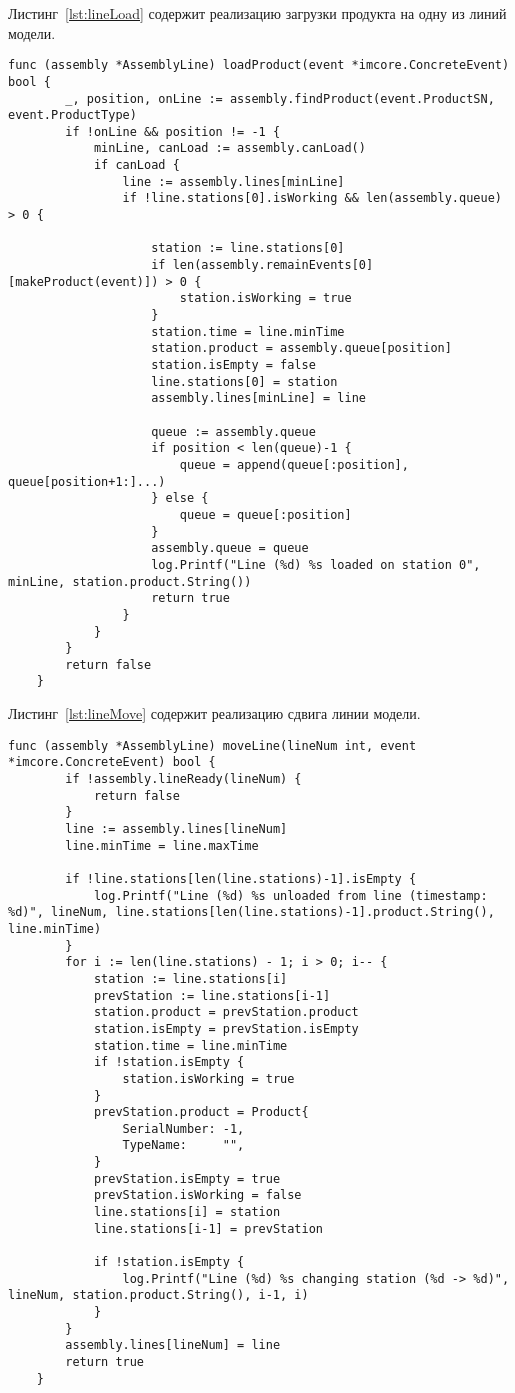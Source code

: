 Листинг~\ref{lst:lineLoad} содержит реализацию загрузки продукта на одну из линий модели.

\begin{lstlisting}[language=Golang,caption={Метод загрузки продукта на одну из линий},label=lst:lineLoad]
	func (assembly *AssemblyLine) loadProduct(event *imcore.ConcreteEvent) bool {
		_, position, onLine := assembly.findProduct(event.ProductSN, event.ProductType)
		if !onLine && position != -1 {
			minLine, canLoad := assembly.canLoad()
			if canLoad {
				line := assembly.lines[minLine]
				if !line.stations[0].isWorking && len(assembly.queue) > 0 {
					
					station := line.stations[0]
					if len(assembly.remainEvents[0][makeProduct(event)]) > 0 {
						station.isWorking = true
					}
					station.time = line.minTime
					station.product = assembly.queue[position]
					station.isEmpty = false
					line.stations[0] = station
					assembly.lines[minLine] = line
					
					queue := assembly.queue
					if position < len(queue)-1 {
						queue = append(queue[:position], queue[position+1:]...)
					} else {
						queue = queue[:position]
					}
					assembly.queue = queue
					log.Printf("Line (%d) %s loaded on station 0", minLine, station.product.String())
					return true
				}
			}
		}
		return false
	}
\end{lstlisting}

Листинг~\ref{lst:lineMove} содержит реализацию сдвига линии модели.

\begin{lstlisting}[language=Golang,caption={Метод сдвига линии},label=lst:lineMove]
	func (assembly *AssemblyLine) moveLine(lineNum int, event *imcore.ConcreteEvent) bool {
		if !assembly.lineReady(lineNum) {
			return false
		}
		line := assembly.lines[lineNum]
		line.minTime = line.maxTime
		
		if !line.stations[len(line.stations)-1].isEmpty {
			log.Printf("Line (%d) %s unloaded from line (timestamp: %d)", lineNum, line.stations[len(line.stations)-1].product.String(), line.minTime)
		}
		for i := len(line.stations) - 1; i > 0; i-- {
			station := line.stations[i]
			prevStation := line.stations[i-1]
			station.product = prevStation.product
			station.isEmpty = prevStation.isEmpty
			station.time = line.minTime
			if !station.isEmpty {
				station.isWorking = true
			}
			prevStation.product = Product{
				SerialNumber: -1,
				TypeName:     "",
			}
			prevStation.isEmpty = true
			prevStation.isWorking = false
			line.stations[i] = station
			line.stations[i-1] = prevStation
			
			if !station.isEmpty {
				log.Printf("Line (%d) %s changing station (%d -> %d)", lineNum, station.product.String(), i-1, i)
			}
		}
		assembly.lines[lineNum] = line
		return true
	}
\end{lstlisting}

